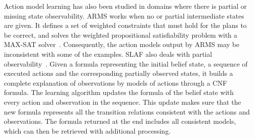 \documentclass[letterpaper]{article} %
\newcommand{\strips}{\textsc{Strips}}     %
\begin{document}
Action model learning has also been studied in domains where there is partial or missing state observability. {\sf ARMS} works when no or partial intermediate states are given. It defines a set of weighted constraints that must hold for the plans to be correct, and solves the weighted propositional satisfiability problem with a MAX-SAT solver~\cite{yang2007learning}. Consequently, the action models output by {\sf ARMS} may be inconsistent with some of the examples. {\sc SLAF} also deals with partial observability~\cite{amir:alearning:JAIR08}. Given a formula representing the initial belief state, a sequence of executed actions and the corresponding partially observed states, it builds a complete explanation of observations by models of actions through a CNF formula. The learning algorithm updates the formula of the belief state with every action and observation in the sequence. This update makes sure that the new formula represents all the transition relations consistent with the actions and observations. The formula returned at the end includes all consistent models, which can then be retrieved with additional processing.

\end{document}
